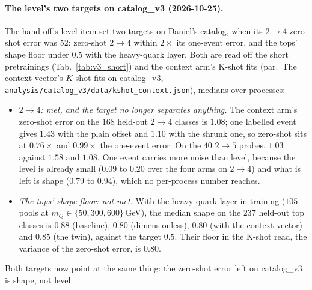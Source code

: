 \documentclass[11pt]{article}
\newcommand{\code}[1]{\texttt{#1}}
\begin{document}
\paragraph{The level's two targets on catalog\_v3 (2026-10-25).} The hand-off's level item set two targets on Daniel's catalog, when its $2\to4$ zero-shot error was $52$:
zero-shot $2\to4$ within $2\times$ its one-event error, and the tops' shape floor under $0.5$
with the heavy-quark layer. Both are read off the short pretrainings (Tab.~\ref{tab:v3_short}) and the context arm's K-shot fits
(par.\ The context vector's $K$-shot fits on catalog\_v3, \code{analysis/catalog\_v3/data/kshot\_context.json}), medians over processes:
\begin{itemize}
  \item \emph{$2\to4$: met, and the target no longer separates anything.} The context arm's zero-shot error on the $168$
    held-out $2\to4$ classes is $1.08$; one labelled event gives $1.43$ with the plain offset and $1.10$ with the shrunk one,
    so zero-shot sits at $0.76\times$ and $0.99\times$ the one-event error. On the $40$ $2\to5$ probes, $1.03$ against $1.58$
    and $1.08$. One event carries more noise than level, because the level is already small ($0.09$ to $0.20$ over the four
    arms on $2\to4$) and what is left is shape ($0.79$ to $0.94$), which no per-process number reaches.
  \item \emph{The tops' shape floor: not met.} With the heavy-quark layer in training ($105$ pools at
    $m_Q\in\{50,300,600\}$\,GeV), the median shape on the $237$ held-out top classes is $0.88$ (baseline), $0.80$
    (dimensionless), $0.80$ (with the context vector) and $0.85$ (the twin), against the target $0.5$. Their floor in the
    K-shot read, the variance of the zero-shot error, is $0.80$.
\end{itemize}
Both targets now point at the same thing: the zero-shot error left on catalog\_v3 is shape, not level.
\end{document}
